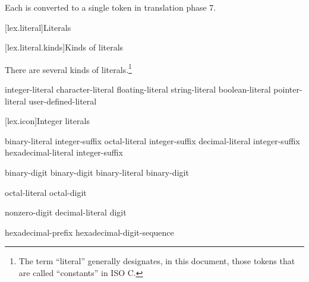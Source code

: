 Each  is converted to a single token
in translation phase 7.%
%

[lex.literal]{Literals}%

[lex.literal.kinds]{Kinds of literals}

\pnum
{}%
%
There are several kinds of literals.\footnote{The term ``literal'' generally designates, in this
document, those tokens that are called ``constants'' in
ISO C. }

\begin{bnf}
\br
    integer-literal\br
    character-literal\br
    floating-literal\br
    string-literal\br
    boolean-literal\br
    pointer-literal\br
    user-defined-literal
\end{bnf}

[lex.icon]{Integer literals}

%
\begin{bnf}
\br
    binary-literal integer-suffix\opt\br
    octal-literal integer-suffix\opt\br
    decimal-literal integer-suffix\opt\br
    hexadecimal-literal integer-suffix\opt
\end{bnf}

\begin{bnf}
\br
     binary-digit\br
     binary-digit\br
    binary-literal \opt binary-digit
\end{bnf}

\begin{bnf}
\br
    \br
    octal-literal \opt octal-digit
\end{bnf}

\begin{bnf}
\br
    nonzero-digit\br
    decimal-literal \opt digit
\end{bnf}

\begin{bnf}
\br
    hexadecimal-prefix hexadecimal-digit-sequence
\end{bnf}

\begin{bnf}
\br
    \br
\end{bnf}

